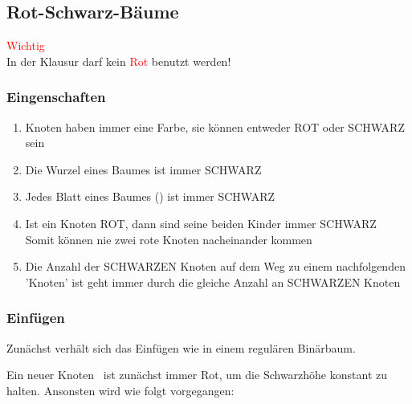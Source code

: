 \documentclass[10pt,a4paper]{article}
\begin{document}
\begin{multicols*}{4}
\subsection{Rot-Schwarz-Bäume}
\textcolor{red}{\sc Wichtig}\hfill\\
In der Klausur darf kein \textcolor{red}{Rot} benutzt werden!

\subsubsection{Eingenschaften}
\begin{enumerate}
	\item Knoten haben immer eine Farbe, sie können entweder ROT oder SCHWARZ sein
	\item Die Wurzel eines Baumes ist immer SCHWARZ
	\item Jedes Blatt eines Baumes (\NIL) ist immer SCHWARZ
	\item Ist ein Knoten ROT, dann sind seine beiden Kinder immer SCHWARZ \\
	      Somit können nie zwei rote Knoten nacheinander kommen
	\item Die Anzahl der SCHWARZEN Knoten auf dem Weg zu einem nachfolgenden \NIL 'Knoten' ist geht immer durch die
	      gleiche Anzahl an SCHWARZEN Knoten
\end{enumerate}

\begingroup
\newcommand{\inc}[1]{}
\newcommand{\uncle}{\textcolor{orange}{Onkel}\;}

\newcommand{\rnode}[1]{\raisebox{-.6ex}{\tikz{\node[scale=0.65, font=\bfseries\footnotesize, r]{#1};}}\,}
\newcommand{\bnode}[1]{\raisebox{-.6ex}{\tikz{\node[scale=0.65, font=\bfseries\footnotesize, b]{#1};}}\,}

\subsubsection{Einfügen}
Zunächst verhält sich das Einfügen wie in einem regulären Binärbaum.

Ein neuer Knoten \rnode{Z} ist zunächst immer Rot, um die Schwarzhöhe konstant zu halten. Ansonsten wird wie folgt
vorgegangen:


\end{multicols*}
\end{document}
